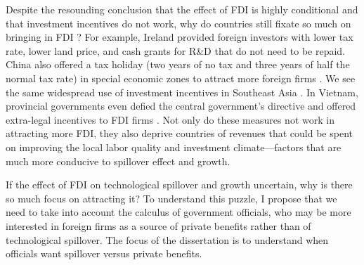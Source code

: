 Despite the resounding conclusion that the effect of FDI is highly conditional and that investment incentives do not work, why do countries still fixate so much on bringing in FDI \citep{Blomstrom2002}? For example, Ireland provided foreign investors with lower tax rate, lower land price, and cash grants for R\&D that do not need to be repaid. China also offered a tax holiday (two years of no tax and three years of half the normal tax rate) in special economic zones to attract more foreign firms \citep{Telford2001}. We see the same widespread use of investment incentives in Southeast Asia \citep{Fletcher2002}. In Vietnam, provincial governments even defied the central government's directive and offered extra-legal incentives to FDI firms \citep{Vu2007}. Not only do these measures not work in attracting more FDI, they also deprive countries of revenues that could be spent on improving the local labor quality and investment climate---factors that are much more conducive to spillover effect and growth.

If the effect of FDI on technological spillover and growth uncertain, why is there so much focus on attracting it? To understand this puzzle, I propose that we need to take into account the calculus of government officials, who may be more interested in foreign firms as a source of private benefits rather than of technological spillover. The focus of the dissertation is to understand when officials want spillover versus private benefits.